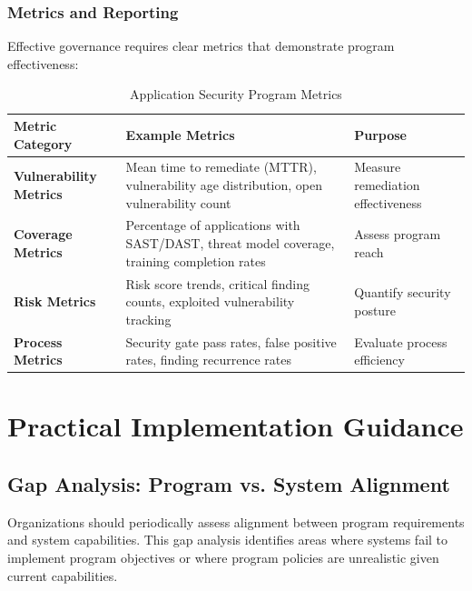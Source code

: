 \documentclass[11pt,letterpaper]{article}
\begin{document}
\subsubsection{Metrics and Reporting}

Effective governance requires clear metrics that demonstrate program effectiveness:

\begin{table}[H]
\centering
\renewcommand{\arraystretch}{1.3}
\begin{tabularx}{\textwidth}{>{\bfseries}p{3.5cm} X p{3cm}}
\toprule
\textbf{Metric Category} & \textbf{Example Metrics} & \textbf{Purpose} \\
\midrule
Vulnerability Metrics & Mean time to remediate (MTTR), vulnerability age distribution, open vulnerability count & Measure remediation effectiveness \\
Coverage Metrics & Percentage of applications with SAST/DAST, threat model coverage, training completion rates & Assess program reach \\
Risk Metrics & Risk score trends, critical finding counts, exploited vulnerability tracking & Quantify security posture \\
Process Metrics & Security gate pass rates, false positive rates, finding recurrence rates & Evaluate process efficiency \\
\bottomrule
\end{tabularx}
\caption{Application Security Program Metrics}
\label{tab:security-metrics}
\end{table}

\section{Practical Implementation Guidance}

\subsection{Gap Analysis: Program vs. System Alignment}

Organizations should periodically assess alignment between program requirements and system capabilities. This gap analysis identifies areas where systems fail to implement program objectives or where program policies are unrealistic given current capabilities.
\end{document}
